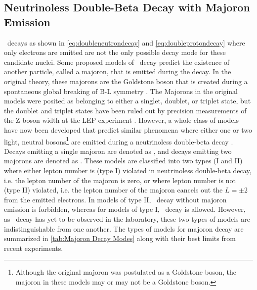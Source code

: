 \subsection{Neutrinoless Double-Beta Decay with Majoron Emission}
\label{ssec:Neutrinoless Double-Beta Decay with Majoron Emisison}
\zeronubb~decays as shown in \autoref{eq:doubleneutrondecay} and \autoref{eq:doubleprotondecay} where only electrons are emitted are not the only possible decay mode for these candidate nuclei.
Some proposed models of \zeronubb~decay predict the existence of another particle, called a majoron, that is emitted during the decay.
In the original theory, these majorons are the Goldstone boson that is created during a spontaneous global breaking of B-L symmetry \cite{CHIKASHIGE1981265}.
The Majorons in the original models were posited as belonging to either a singlet, doublet, or triplet state, but the doublet and triplet states have been ruled out by precision measurements of the Z boson width at the LEP experiment \cite{ALEPH:2005ab}.
However, a whole class of models have now been developed that predict similar phenomena where either one or two light, neutral bosons\footnote{Although the original majoron was postulated as a Goldstone boson, the majoron in these models may or may not be a Goldstone boson.}
are emitted during a neutrinoless double-beta decay \cite{HIRSCH19968}.
Decays emitting a single majoron are denoted as \zeronubbonechi, and decays emitting two majorons are denoted as \zeronubbtwochi.
These models are classified into two types (I and II) where either lepton number is (type I) violated in neutrinoless double-beta decay, i.e. the lepton number of the majoron is zero, or where lepton number is not (type II) violated, i.e. the lepton number of the majoron cancels out the $L=\pm2$ from the emitted electrons.
In models of type II, \zeronubb~decay without majoron emission is forbidden, whereas for models of type I, \zeronubb~decay is allowed.
However, as \zeronubb~decay has yet to be observed in the laboratory, these two types of models are indistinguishable from one another.
The types of models for majoron decay are summarized in \autoref{tab:Majoron Decay Modes} along with their best limits from recent experiments. 
